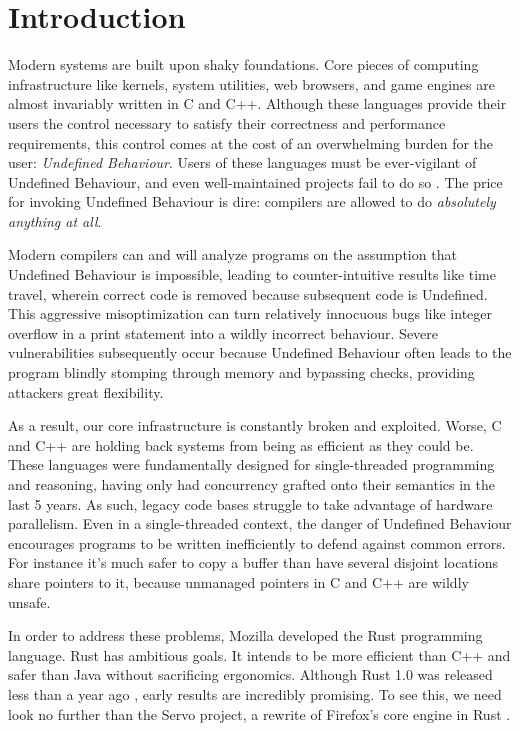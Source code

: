 \chapter{Introduction}
\label{ch:intro}

Modern systems are built upon shaky foundations. Core pieces of computing
infrastructure like kernels, system utilities, web browsers, and game engines
are almost invariably written in C and C++. Although these languages provide
their users the control necessary to satisfy their correctness and performance
requirements, this control comes at the cost of an overwhelming burden for the
user: \emph{Undefined Behaviour}. Users of these languages must be ever-vigilant
of Undefined Behaviour, and even well-maintained projects fail to do so
\cite{wang2012undefined}. The price for invoking Undefined Behaviour is dire:
compilers are allowed to do \emph{absolutely anything at all}.

Modern compilers can and will analyze programs on the assumption that Undefined
Behaviour is impossible, leading to counter-intuitive results like time travel,
wherein correct code is removed because subsequent code is Undefined. This
aggressive misoptimization can turn relatively innocuous bugs like integer
overflow in a print statement into a wildly incorrect behaviour. Severe
vulnerabilities subsequently occur because Undefined Behaviour often leads to
the program blindly stomping through memory and bypassing checks, providing attackers
great flexibility.

As a result, our core infrastructure is constantly broken and exploited. Worse,
C and C++ are holding back systems from being as efficient as they could be.
These languages were fundamentally designed for single-threaded programming and
reasoning, having only had concurrency grafted onto their semantics in the last
5 years. As such, legacy code bases struggle to take advantage of hardware
parallelism. Even in a single-threaded context,
the danger of Undefined Behaviour encourages programs to be written
inefficiently to defend against common errors. For instance it's much safer
to copy a buffer than have several disjoint locations share pointers to it,
because unmanaged pointers in C and C++ are wildly unsafe.

In order to address these problems, Mozilla developed the Rust programming language.
Rust has ambitious goals. It intends to be more efficient than C++ and safer
than Java without sacrificing ergonomics. Although Rust 1.0 was released less
than a year ago \cite{rust1}, early results are incredibly promising. To see this, we need
look no further than the Servo project, a rewrite of Firefox's core engine in Rust
\cite{servo}.

